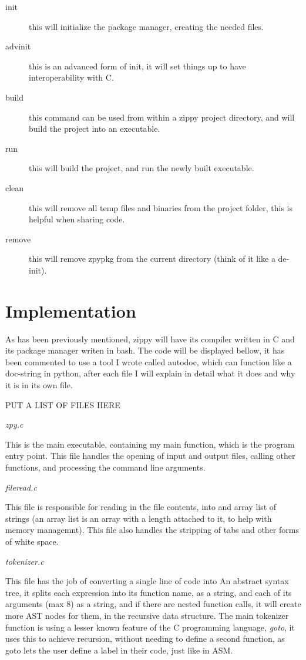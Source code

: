 \documentclass[a4paper,12pt]{article}
\begin{document}
{\begin{description}
	\item[init] this will initialize the package manager, creating the needed files.
	\item[advinit] this is an advanced form of init, it will set things up to have interoperability with C.
	\item[build] this command can be used from within a zippy project directory, and will build the project into an executable.
	\item[run] this will build the project, and run the newly built executable.
	\item[clean] this will remove all temp files and binaries from the project folder, this is helpful when sharing code.
	\item[remove] this will remove zpypkg from the current directory (think of it like a de-init).
\end{description}

\section{Implementation}
As has been previously mentioned, zippy will have its compiler written in C and its package manager writen in bash.
The code will be displayed bellow, it has been commented to use a tool I wrote called autodoc, which can function
like a doc-string in python, after each file I will explain in detail what it does and why it is in its own file.

PUT A LIST OF FILES HERE


\textit{zpy.c}

This is the main executable, containing my main function, which is the program entry point. This file handles the
opening of input and output files, calling other functions, and processing the command line arguments.

\textit{fileread.c}

This file is responsible for reading in the file contents, into and array list of strings (an array list is an array
with a length attached to it, to help with memory managemnt). This file also handles the stripping of tabs and other 
forms of white space.


\textit{tokenizer.c}

This file has the job of converting a single line of code into An abstract syntax tree, it splits each expression into
its function name, as a string, and each of its arguments (max 8) as a string, and if there are nested function calls, 
it will create more AST nodes for them, in the recursive data structure. The main tokenizer function is using
a lesser known feature of the C programming language, \textit{goto}, it uses this to achieve recursion, without needing
to define a second function, as goto lets the user define a label in their code, just like in ASM. 

}
\end{document}
